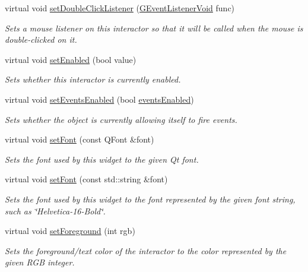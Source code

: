 \begin{DoxyCompactItemize}
virtual void \mbox{\hyperlink{classsgl_1_1GInteractor_a50096194d66f48c92dd4c512d41bfc76}{set\+Double\+Click\+Listener}} (\mbox{\hyperlink{namespacesgl_a54427ce97bb1c2804e4fe2b0a62e8b17}{G\+Event\+Listener\+Void}} func)
\begin{DoxyCompactList}\small\item\em Sets a mouse listener on this interactor so that it will be called when the mouse is double-\/clicked on it. \end{DoxyCompactList}\item 
virtual void \mbox{\hyperlink{classsgl_1_1GInteractor_ab831367dd84bbd579e02e55bacb21343}{set\+Enabled}} (bool value)
\begin{DoxyCompactList}\small\item\em Sets whether this interactor is currently enabled. \end{DoxyCompactList}\item 
virtual void \mbox{\hyperlink{classsgl_1_1GObservable_afaa30b2a9e0f378fd1c70d2f1d0b8216}{set\+Events\+Enabled}} (bool \mbox{\hyperlink{classsgl_1_1GInteractor_a597a370b592e3737d38d9d2f4e2031ea}{events\+Enabled}})
\begin{DoxyCompactList}\small\item\em Sets whether the object is currently allowing itself to fire events. \end{DoxyCompactList}\item 
virtual void \mbox{\hyperlink{classsgl_1_1GInteractor_a2592348886ffea646c6534bf88f7c49d}{set\+Font}} (const Q\+Font \&font)
\begin{DoxyCompactList}\small\item\em Sets the font used by this widget to the given Qt font. \end{DoxyCompactList}\item 
virtual void \mbox{\hyperlink{classsgl_1_1GInteractor_a8e096e8818d838aceae1d46d58fb3a7b}{set\+Font}} (const std\+::string \&font)
\begin{DoxyCompactList}\small\item\em Sets the font used by this widget to the font represented by the given font string, such as \char`\"{}\+Helvetica-\/16-\/\+Bold\char`\"{}. \end{DoxyCompactList}\item 
virtual void \mbox{\hyperlink{classsgl_1_1GInteractor_a9eb856b5ff83a19df3831a31f15f4563}{set\+Foreground}} (int rgb)
\begin{DoxyCompactList}\small\item\em Sets the foreground/text color of the interactor to the color represented by the given R\+GB integer. \end{DoxyCompactList}\item 

\end{DoxyCompactItemize}
